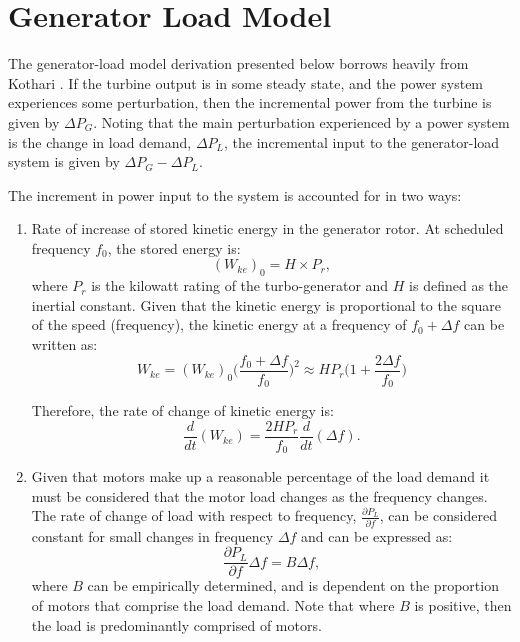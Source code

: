 \section{Generator Load Model}\label{app:gen_load_model}
The generator-load model derivation presented below borrows heavily from Kothari \cite{Kothari2011}. If the turbine output is in some steady state, and the power system experiences some perturbation, then the incremental power from the turbine is given by $\Delta P_G$. Noting that the main perturbation experienced by a power system is the change in load demand, $\Delta P_L$, the incremental input to the generator-load system is given by $\Delta P_G - \Delta P_L$.

The increment in power input to the system is accounted for in two ways:
\begin{enumerate}
	
	\item Rate of increase of stored kinetic energy in the generator rotor. At scheduled frequency $f_0$, the stored energy is:
	\begin{equation}
		(W_{ke})_0 = H \times P_r,
	\end{equation}
	where $P_r$ is the kilowatt rating of the turbo-generator and $H$ is defined as the inertial constant. Given that the kinetic energy is proportional to the square of the speed (frequency), the kinetic energy at a frequency of $f_0 + \Delta f$ can be written as:
	\begin{equation}
		W_{ke} = (W_{ke})_0 \bigg( \frac{f_0 + \Delta f}{f_0} \bigg)^2 \approx H P_r \bigg( 1 + \frac{2\Delta f}{f_0} \bigg)
	\end{equation}
	
	Therefore, the rate of change of kinetic energy is:
	\begin{equation}
		\frac{d}{dt}(W_{ke}) = \frac{2 H P_r}{f_0} \frac{d}{dt} (\Delta f). \label{eq:A11}
	\end{equation}
	
	\item Given that motors make up a reasonable percentage of the load demand it must be considered that the motor load changes as the frequency changes. The rate of change of load with respect to frequency, $\frac{\partial P_L}{\partial f}$, can be considered constant for small changes in frequency $\Delta f$ and can be expressed as:
	\begin{equation}
		\frac{\partial P_L}{\partial f} \Delta f = B \Delta f \label{eq:A12},
	\end{equation}
	where $B$ can be empirically determined, and is dependent on the proportion of motors that comprise the load demand. Note that where $B$ is positive, then the load is predominantly comprised of motors.
\end{enumerate}


